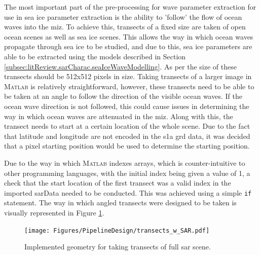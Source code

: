 The most important part of the pre-processing for wave parameter extraction for use in sea ice parameter extraction is the ability to 'follow' the flow of ocean waves into the \acs{miz}. To achieve this, transects of a fixed size are taken of open ocean scenes as well as sea ice scenes. This allows the way in which ocean waves propagate through sea ice to be studied, and due to this, sea ice parameters are able to be extracted using the models described in Section \ref{subsec:litReview.sarCharac.seaIceWaveModelling}. As per \cite{Wadhams2004,DeSanti2018} the size of these transects should be 512x512 pixels in size. Taking transects of a larger image in \textsc{Matlab} is relatively straightforward, however, these transects need to be able to be taken at an angle to follow the direction of the visible ocean waves. If the ocean wave direction is not followed, this could cause issues in determining the way in which ocean waves are attenuated in the \acs{miz}. Along with this, the transect needs to start at a certain location of the whole scene. Due to the fact that latitude and longitude are not encoded in the \acs{s1a} \ac{grd} data, it was decided that a pixel starting position would be used to determine the starting position.

Due to the way in which \textsc{Matlab} indexes arrays, which is counter-intuitive to other programming languages, with the initial index being given a value of \textsc{1}, a check that the start location of the first transect was a valid index in the imported sarData needed to be conducted. This was achieved using a simple \lstinline{if} statement. The way in which angled transects were designed to be taken is visually represented in Figure \ref{fig:systemDesign.transects}. 


\begin{figure}[H]
    \centering
    \texttt{[image: Figures/PipelineDesign/transects\_w\_SAR.pdf]}
    \caption{Implemented geometry for taking transects of full \acs{sar} scene.}
    \label{fig:systemDesign.transects}
\end{figure}

